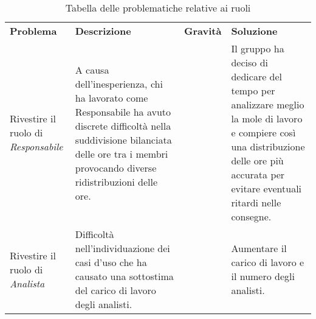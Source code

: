    
\renewcommand{\arraystretch}{1.5}
\begin{longtable}{  >{\centering}p{} >{}p{}
    >{\centering}p{} >{}p{}}
    \caption{Tabella delle problematiche relative ai ruoli}	\\
    \rowcolor{\primaryColor}
    \textcolor{\secondaryColor}{
    \centering\textbf{Problema}}     & \textcolor{\secondaryColor}{\centering\textbf{Descrizione}}    & \textcolor{\secondaryColor}
    {\centering\textbf{Gravità}} & \textcolor{\secondaryColor}{\centering\textbf{Soluzione}}\\
   
    Rivestire il ruolo di \textit{Responsabile}  
    &  A causa dell'inesperienza, chi ha lavorato come Responsabile ha avuto discrete difficoltà nella suddivisione bilanciata delle ore tra i membri provocando diverse ridistribuzioni delle ore.
    & 2  
    & Il gruppo ha deciso di dedicare del tempo per analizzare meglio la mole di lavoro e compiere così una distribuzione delle ore più accurata per evitare eventuali ritardi nelle consegne. {} \\
    Rivestire il ruolo di \textit{Analista}
    & Difficoltà nell'individuazione dei casi d'uso che ha causato una sottostima del carico di lavoro degli analisti.
    & 3
    & Aumentare il carico di lavoro e il numero degli analisti. \\
    \end{longtable}
